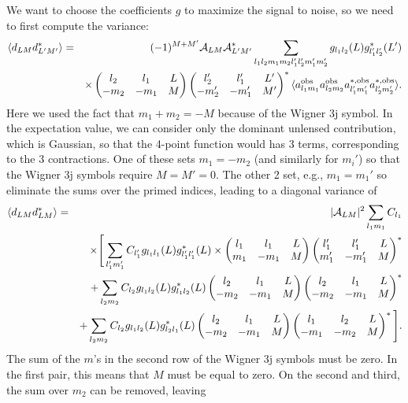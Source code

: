 \documentclass[prl,amsmath,amssymb,floatfix,superscriptaddress,nofootinbib,twocolumn]{revtex4-1}
\def\bea{\begin{eqnarray}}
\def\eea{\end{eqnarray}}
\newcommand{\vs}{\nonumber\\}
\begin{document}
 We want to choose the coefficients $g$ to maximize the signal to noise, so we need to first compute the variance:
 \bea
 \langle d_{LM} d^*_{L'M'} \rangle &=& (-1)^{M+M'}  \mathcal{A}_{LM}\mathcal{A}^*_{L'M'} \sum_{l_1l_2m_1m_2 l_1'l_2'm_1'm_2'} g_{l_1l_2}(L)  g^*_{l_1'l_2'}(L') \vs
 &&\times \left(\begin{matrix} l_2 & l_1 &L\cr -m_2&-m_1&M\end{matrix}\right)
 \left(\begin{matrix} l_2' & l_1' &L'\cr -m_2'&-m_1'&M'\end{matrix}\right)^*
 \langle a^{\rm obs}_{l_1m_1} a^{\rm obs}_{l_2m_2}  a^{*,\rm obs}_{l_1'm_1'} a^{*,\rm obs}_{l_2'm_2'} \rangle.
 \eea
 Here we used the fact that $m_1+m_2=-M$ because of the Wigner 3j symbol. In the expectation value, we can consider only the dominant unlensed contribution, which is Gaussian, so that the 4-point function would has 3 terms, corresponding to the 3 contractions. One of these sets $m_1=-m_2$ (and similarly for $m_i'$) so that the Wigner 3j symbols require $M=M'=0$. The other 2 set, e.g., $m_1=m_1'$ so eliminate the sums over the primed indices, leading to a diagonal variance of
 \bea
 \langle d_{LM} d^*_{LM} \rangle &=& \vert \mathcal{A}_{LM}\vert^2
 \sum_{l_1m_1} C_{l_1}
 \vs
 &&\times 
\Bigg[ \sum_{ l_1'm_1'}  C_{l_1'} g_{l_1l_1}(L)  g^*_{l_1'l_1'}(L) 
\times \left(\begin{matrix} l_1 & l_1 &L\cr m_1&-m_1&M\end{matrix}\right)
 \left(\begin{matrix} l_1' & l_1' &L\cr m_1'&-m_1'&M\end{matrix}\right)^*\vs
 &&+ \sum_{l_2m_2}  C_{l_2}  g_{l_1l_2}(L)  g^*_{l_1l_2}(L)  \left(\begin{matrix} l_2 & l_1 &L\cr -m_2&-m_1&M\end{matrix}\right)
 \left(\begin{matrix} l_2 & l_1 &L\cr -m_2&-m_1&M\end{matrix}\right)^* 
 \vs
 &&+ \sum_{l_2m_2}  C_{l_2} g_{l_1l_2}(L)  g^*_{l_2l_1}(L)  \left(\begin{matrix} l_2 & l_1 &L\cr -m_2&-m_1&M\end{matrix}\right)
 \left(\begin{matrix} l_1 & l_2 &L\cr -m_1&-m_2&M\end{matrix}\right)^* 
 \Bigg].
  \eea 
  The sum of the $m$'s in the second row of the Wigner 3j symbols must be zero. In the first pair, this means that $M$ must be equal to zero. On the second and third, the sum over $m_2$ can be removed, leaving
\end{document}
